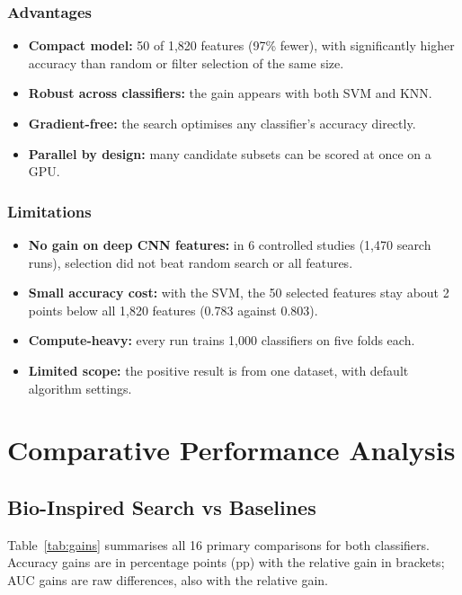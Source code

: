 \documentclass[12pt,a4paper]{report}
\begin{document}
\subsection{Advantages}
\begin{itemize}
  \item \textbf{Compact model:} 50 of 1,820 features (97\% fewer), with significantly higher accuracy than random or
        filter selection of the same size.
  \item \textbf{Robust across classifiers:} the gain appears with both SVM and KNN.
  \item \textbf{Gradient-free:} the search optimises any classifier's accuracy directly.
  \item \textbf{Parallel by design:} many candidate subsets can be scored at once on a GPU.
\end{itemize}

\subsection{Limitations}
\begin{itemize}
  \item \textbf{No gain on deep CNN features:} in 6 controlled studies (1,470 search runs), selection did not beat
        random search or all features.
  \item \textbf{Small accuracy cost:} with the SVM, the 50 selected features stay about 2 points below all 1,820
        features (0.783 against 0.803).
  \item \textbf{Compute-heavy:} every run trains 1,000 classifiers on five folds each.
  \item \textbf{Limited scope:} the positive result is from one dataset, with default algorithm settings.
\end{itemize}

\chapter{Comparative Performance Analysis}

\section{Bio-Inspired Search vs Baselines}
Table~\ref{tab:gains} summarises all 16 primary comparisons for both classifiers. Accuracy gains are in percentage
points (pp) with the relative gain in brackets; AUC gains are raw differences, also with the relative gain.
\end{document}
